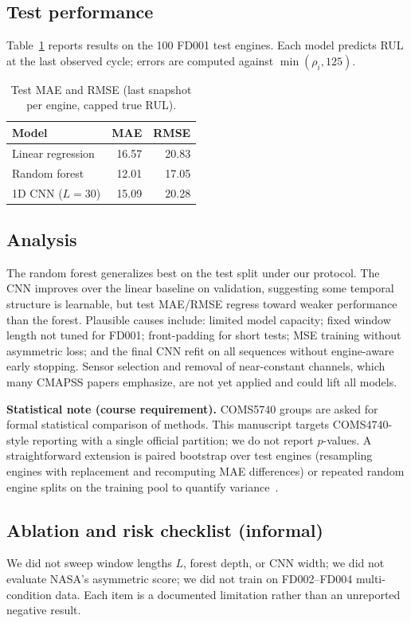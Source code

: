 \documentclass[11pt]{article}
\begin{document}
\subsection{Test performance}
Table~\ref{tab:test} reports results on the 100 FD001 test engines. Each model predicts RUL at the last observed cycle; errors are computed against $\min(\rho_i,125)$.

\begin{table}[ht]
  \centering
  \caption{Test MAE and RMSE (last snapshot per engine, capped true RUL).}
  \label{tab:test}
  \begin{tabular}{lrr}
    \toprule
    Model & MAE & RMSE \\
    \midrule
    Linear regression & 16.57 & 20.83 \\
    Random forest & 12.01 & 17.05 \\
    1D CNN ($L{=}30$) & 15.09 & 20.28 \\
    \bottomrule
  \end{tabular}
\end{table}

\subsection{Analysis}
The random forest generalizes best on the test split under our protocol. The CNN improves over the linear baseline on validation, suggesting some temporal structure is learnable, but test MAE/RMSE regress toward weaker performance than the forest. Plausible causes include: limited model capacity; fixed window length not tuned for FD001; front-padding for short tests; MSE training without asymmetric loss; and the final CNN refit on all sequences without engine-aware early stopping. Sensor selection and removal of near-constant channels, which many CMAPSS papers emphasize, are not yet applied and could lift all models.

\textbf{Statistical note (course requirement).} COMS5740 groups are asked for formal statistical comparison of methods. This manuscript targets COMS4740-style reporting with a single official partition; we do not report $p$-values. A straightforward extension is paired bootstrap over test engines (resampling engines with replacement and recomputing MAE differences) or repeated random engine splits on the training pool to quantify variance~\cite{efron1994introduction}.

\subsection{Ablation and risk checklist (informal)}
We did not sweep window lengths $L$, forest depth, or CNN width; we did not evaluate NASA's asymmetric score; we did not train on FD002--FD004 multi-condition data. Each item is a documented limitation rather than an unreported negative result.
\end{document}

